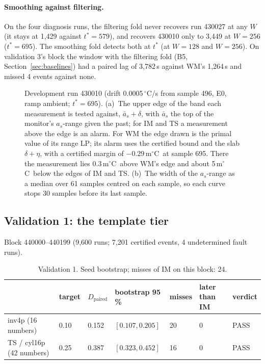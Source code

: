 \documentclass[11pt,a4paper]{article}
\newcommand{\degC}{\ensuremath{{}^\circ}C}
\newcommand{\Dp}{D_{\mathrm{paired}}}
\newcommand{\tstar}{t^{\ast}}
\begin{document}
\paragraph{Smoothing against filtering.} On the four diagnosis runs, the filtering fold never recovers run 430027 at
any $W$ (it stays at 1,429 against $\tstar = 579$), and recovers 430010 only to 3,449 at $W = 256$ ($\tstar = 695$). The
smoothing fold detects both at $\tstar$ (at $W = 128$ and $W = 256$). On validation 3's block the window with the
filtering fold (B5, Section~\ref{sec:baselines}) had a paired lag of 3,782\,s against WM's 1,264\,s and missed 4
events against none.

\begin{figure}[t]
\centering

\caption{Development run 430010 (drift 0.0005\,\degC/s from sample 496, E0, ramp ambient; $\tstar = 695$).
(a)~The upper edge of the band each measurement is tested against, $\bar a_s+\delta$, with $\bar a_s$ the top of the
monitor's $a_s$-range given the past; for IM and TS a measurement above the edge is an alarm. For WM the edge drawn is
the primal value of its range LP; its alarm uses the certified bound and the slab $\delta+\eta$, with a certified
margin of $-0.29$\,m\degC\ at sample 695. There the measurement lies 0.3\,m\degC\ above WM's edge and about
5\,m\degC\ below the edges of IM and TS. (b)~The width of the $a_s$-range as a median over 61 samples centred on each
sample, so each curve stops 30 samples before its last sample.}
\label{fig:trace}
\end{figure}

\subsection{Validation 1: the template tier}\label{sec:val1}

Block 440000--440199 (9,600 runs; 7,201 certified events, 4 undetermined fault runs).

\begin{table}[ht]
\centering\small
\caption{Validation 1. Seed bootstrap; misses of IM on this block: 24.}\label{tab:val1}
\begin{tabular}{lllllll}
\toprule
 & target & $\Dp$ & bootstrap 95\,\% & misses & later than IM & verdict\\
\midrule
inv4p (16 numbers) & 0.10 & 0.152 & $[0.107, 0.205]$ & 20 & 0 & PASS\\
TS / cyl16p (42 numbers) & 0.25 & 0.387 & $[0.323, 0.452]$ & 16 & 0 & PASS\\
\bottomrule
\end{tabular}
\end{table}
\end{document}
